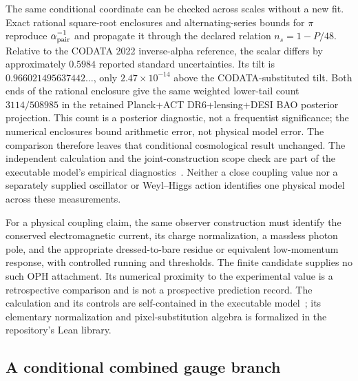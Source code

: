 The same conditional coordinate can be checked across scales without a new
fit. Exact rational square-root enclosures and alternating-series bounds
for $\pi$ reproduce $\alpha_{\rm pair}^{-1}$ and propagate it through the
declared relation $n_s=1-P/48$. Relative to the CODATA 2022 inverse-alpha
reference, the scalar differs by approximately $0.5984$ reported standard
uncertainties. Its tilt is $0.966021495637442\ldots$, only
$2.47\times10^{-14}$ above the CODATA-substituted tilt. Both ends of the
rational enclosure give the same weighted lower-tail count $3114/508985$
in the retained Planck+ACT DR6+lensing+DESI BAO posterior projection.
This count is a posterior diagnostic, not a frequentist significance;
the numerical enclosures bound arithmetic error, not physical model error.
The comparison therefore leaves that conditional cosmological result
unchanged. The independent calculation and the joint-construction scope
check are part of the executable model's empirical
diagnostics~\cite{ophmodel}. Neither a
close coupling value nor a separately supplied oscillator or Weyl--Higgs
action identifies one physical model across these measurements.

For a physical coupling claim, the same observer construction must identify
the conserved electromagnetic current, its charge normalization, a massless
photon pole, and the appropriate dressed-to-bare residue or equivalent
low-momentum response, with controlled running and thresholds. The finite
candidate supplies no such OPH attachment. Its numerical proximity to the
experimental value is a retrospective comparison and is not a prospective
prediction record. The calculation and its controls are self-contained in
the executable model~\cite{ophmodel}; its elementary normalization and
pixel-substitution algebra is formalized in the repository's Lean library.

\subsection{A conditional combined gauge branch}

